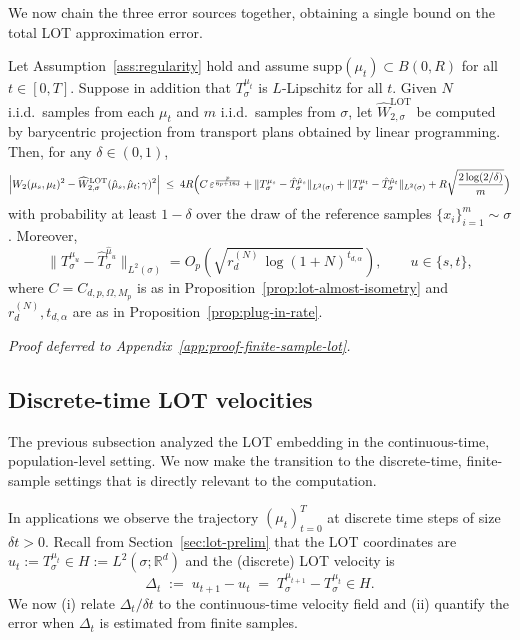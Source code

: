 \documentclass[11pt]{article}
\newcommand{\R}{\mathbb{R}}
\newcommand{\1}{\mathbf{1}}
\begin{document}
We now chain the three error sources together, obtaining a single bound on the total LOT approximation error. 

\begin{theorem}\label{thm:finite-sample-lot}
Let Assumption~\ref{ass:regularity} hold and assume $\mathrm{supp}(\mu_t)\subset
B(0,R)$ for all $t\in[0,T]$. Suppose in addition that $T_\sigma^{\mu_t}$ is
$L$-Lipschitz for all $t$. Given $N$ i.i.d.\ samples from each $\mu_t$ and
$m$ i.i.d.\ samples from $\sigma$, let $\widehat{W}_{2,\sigma}^{\mathrm{LOT}}$ be computed by barycentric projection from transport plans obtained by linear programming. Then, for any $\delta\in(0,1)$,
\begin{equation}\label{eq:combined-bound}
  \left|W_2(\mu_s,\mu_t)^2
  - \widehat{W}_{2,\sigma}^{\mathrm{LOT}}(\hat{\mu}_s,\hat{\mu}_t;\gamma)^2\right|
  \;\le\; 4R\Bigl(
    C\,\varepsilon^{\frac{p}{6p+16d}}
    + \|T_\sigma^{\mu_s}-\hat{T}_\sigma^{\hat{\mu}_s}\|_{L^2(\sigma)}
    + \|T_\sigma^{\mu_t}-\hat{T}_\sigma^{\hat{\mu}_t}\|_{L^2(\sigma)}
    + R\sqrt{\frac{2\log(2/\delta)}{m}}
  \Bigr)
\end{equation}
with probability at least $1-\delta$ over the draw of the reference samples
$\{x_i\}_{i=1}^m\sim\sigma$. Moreover,
\[
\|T_\sigma^{\mu_u}-\hat{T}_\sigma^{\hat{\mu}_u}\|_{L^2(\sigma)}
= O_p\!\left(\sqrt{r_d^{(N)}\,\log(1+N)^{t_{d,\alpha}}}\right),
\qquad u\in\{s,t\},
\]
where $C=C_{d,p,\Omega,M_p}$ is as in Proposition~\ref{prop:lot-almost-isometry} and $r_d^{(N)},t_{d,\alpha}$ are as in Proposition~\ref{prop:plug-in-rate}.
\end{theorem}
\noindent\emph{Proof deferred to Appendix~\ref{app:proof-finite-sample-lot}.}


\subsection{Discrete-time LOT velocities}\label{sec:discrete-time-lot}

The previous subsection analyzed the LOT embedding in the continuous-time, population-level setting. We now make the transition to the discrete-time, finite-sample settings that is directly relevant to the computation.

In applications we observe the trajectory $(\mu_t)_{t=0}^T$ at discrete time steps of size $\delta t>0$. Recall from Section~\ref{sec:lot-prelim} that the LOT coordinates are $u_t:=T_\sigma^{\mu_t}\in H:=L^2(\sigma;\R^d)$ and the
(discrete) LOT velocity is
\begin{equation}\label{eq:discrete-lot-velocity}
  \Delta_t \;:=\; u_{t+1}-u_t
  \;=\; T_\sigma^{\mu_{t+1}}-T_\sigma^{\mu_t}\in H.
\end{equation}
We now (i) relate $\Delta_t/\delta t$ to the continuous-time velocity field and (ii) quantify the error when $\Delta_t$ is estimated from finite samples.
\end{document}
